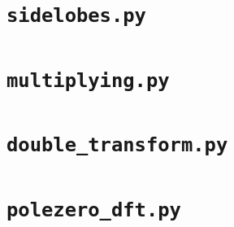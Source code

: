 \documentclass[a4paper, 11pt]{article}
\begin{document}
\section{\texttt{sidelobes.py}}


\newpage
\section{\texttt{multiplying.py}}


\newpage
\section{\texttt{double\_transform.py}}


\newpage
\section{\texttt{polezero\_dft.py}}

\end{document}
